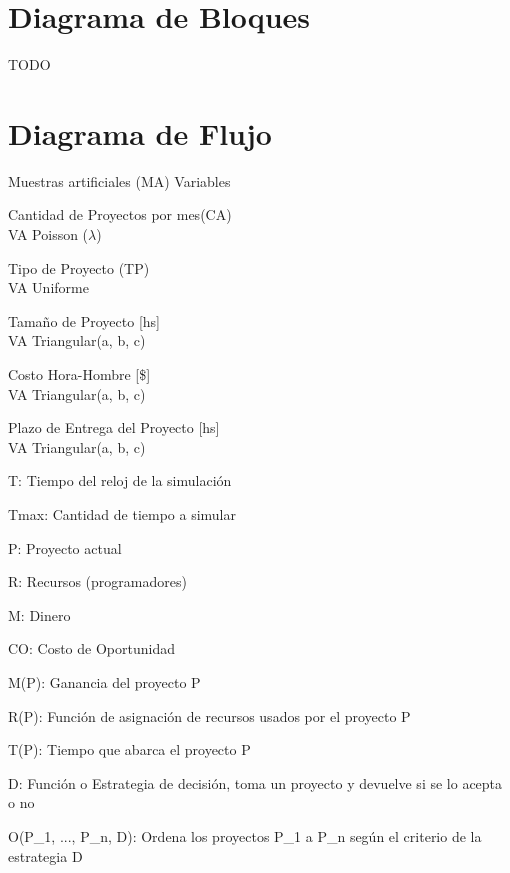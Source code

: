 \section{Diagrama de Bloques}
TODO

\section{Diagrama de Flujo}

\begin{multicols}{2}
Muestras artificiales (MA)
Variables

\begin{enumerate*}
    \item Cantidad de Proyectos por mes(CA)\\
            VA Poisson ($\lambda$)
    \item Tipo de Proyecto (TP)\\
            VA Uniforme
    \item Tamaño de Proyecto [hs]\\
            VA Triangular(a, b, c)
    \item Costo Hora-Hombre [\$]\\
            VA Triangular(a, b, c)
    \item Plazo de Entrega del Proyecto [hs]\\
            VA Triangular(a, b, c)
\end{enumerate*}
\vfill
\columnbreak
\begin{itemize*}
 \item T: Tiempo del reloj de la simulación
 \item Tmax: Cantidad de tiempo a simular
 \item P: Proyecto actual
 \item R: Recursos (programadores)
 \item M: Dinero
 \item CO: Costo de Oportunidad
 \item M(P): Ganancia del proyecto P
 \item R(P): Función de asignación de recursos usados por el proyecto P
 \item T(P): Tiempo que abarca el proyecto P
 \item D: Función o Estrategia de decisión, toma un proyecto y devuelve si se lo acepta o no
 \item O(P\_1, ..., P\_n, D): Ordena los proyectos P\_1 a P\_n según el criterio de la estrategia D

\end{itemize*}

\end{multicols}


